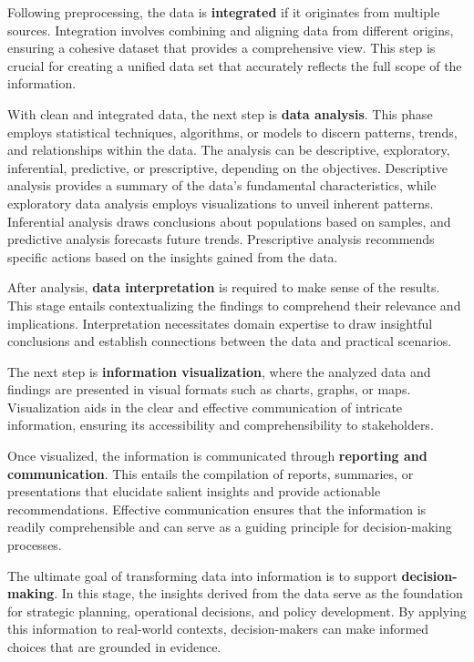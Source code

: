 \documentclass[
  12 pt,
]{Nemilov}
\begin{document}
Following preprocessing, the data is \textbf{integrated} if it originates from multiple sources. Integration involves combining and aligning data from different origins, ensuring a cohesive dataset that provides a comprehensive view. This step is crucial for creating a unified data set that accurately reflects the full scope of the information.

With clean and integrated data, the next step is \textbf{data analysis}. This phase employs statistical techniques, algorithms, or models to discern patterns, trends, and relationships within the data. The analysis can be descriptive, exploratory, inferential, predictive, or prescriptive, depending on the objectives. Descriptive analysis provides a summary of the data's fundamental characteristics, while exploratory data analysis employs visualizations to unveil inherent patterns. Inferential analysis draws conclusions about populations based on samples, and predictive analysis forecasts future trends. Prescriptive analysis recommends specific actions based on the insights gained from the data.

After analysis, \textbf{data interpretation} is required to make sense of the results. This stage entails contextualizing the findings to comprehend their relevance and implications. Interpretation necessitates domain expertise to draw insightful conclusions and establish connections between the data and practical scenarios.

The next step is \textbf{information visualization}, where the analyzed data and findings are presented in visual formats such as charts, graphs, or maps. Visualization aids in the clear and effective communication of intricate information, ensuring its accessibility and comprehensibility to stakeholders.

Once visualized, the information is communicated through \textbf{reporting and communication}. This entails the compilation of reports, summaries, or presentations that elucidate salient insights and provide actionable recommendations. Effective communication ensures that the information is readily comprehensible and can serve as a guiding principle for decision-making processes.

The ultimate goal of transforming data into information is to support \textbf{decision-making}. In this stage, the insights derived from the data serve as the foundation for strategic planning, operational decisions, and policy development. By applying this information to real-world contexts, decision-makers can make informed choices that are grounded in evidence.
\end{document}
